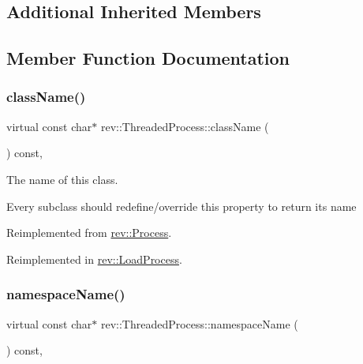 \subsection*{Additional Inherited Members}


\subsection{Member Function Documentation}
\mbox{\label{classrev_1_1_threaded_process_a7b198a27cb18d6da765cef1ed66a169c}} 
\subsubsection{\texorpdfstring{className()}{className()}}
{\footnotesize\ttfamily virtual const char$\ast$ rev\+::\+Threaded\+Process\+::class\+Name (\begin{DoxyParamCaption}{ }\end{DoxyParamCaption}) const\hspace{0.3cm}{\ttfamily [inline]}, {\ttfamily [virtual]}}



The name of this class. 

Every subclass should redefine/override this property to return its name 

Reimplemented from \mbox{\hyperlink{classrev_1_1_process_adc27ddf4c0f44dab54a5f797c7135c44}{rev\+::\+Process}}.



Reimplemented in \mbox{\hyperlink{classrev_1_1_load_process_ad826a8b7aab260c491bcd4344564947d}{rev\+::\+Load\+Process}}.

\mbox{\label{classrev_1_1_threaded_process_a102e7ef754f41bb16225c4207b6b3c58}} 
\subsubsection{\texorpdfstring{namespaceName()}{namespaceName()}}
{\footnotesize\ttfamily virtual const char$\ast$ rev\+::\+Threaded\+Process\+::namespace\+Name (\begin{DoxyParamCaption}{ }\end{DoxyParamCaption}) const\hspace{0.3cm}{\ttfamily [inline]}, {\ttfamily [virtual]}}



